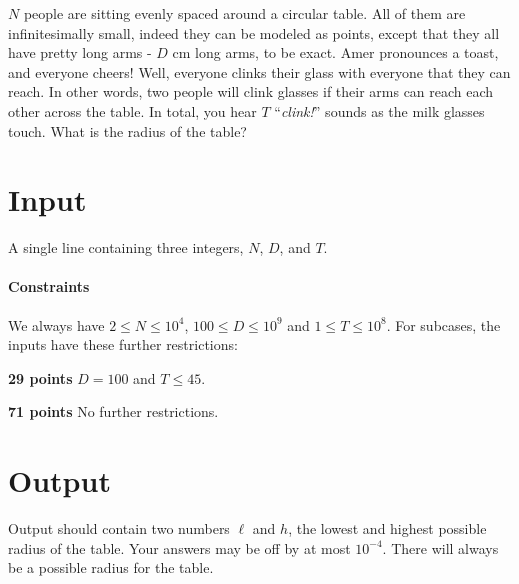 $N$ people are sitting evenly spaced around a circular table. All of them are infinitesimally small, indeed they can be modeled as points, except that they all have pretty long arms - $D$ cm long arms, to be exact. Amer pronounces a toast, and everyone cheers! Well, everyone clinks their glass with everyone that they can reach. In other words, two people will clink glasses if their arms can reach each other across the table. In total, you hear $T$ ``{\em clink!}'' sounds as the milk glasses touch. What is the radius of the table? 

\section*{Input}
A single line containing three integers, $N$, $D$, and $T$.

\paragraph*{Constraints} We always have $2 \leq N \leq 10^4$, $100 \leq D \leq 10^9$ and $1 \leq T \leq 10^{8}$. For subcases, the inputs have these further restrictions:

\begin{description}
  \item{\textbf{29 points}} $D = 100$ and $T \leq 45$.
  \item{\textbf{71 points}} No further restrictions.
\end{description}

\section*{Output}
Output should contain two numbers $\ell$ and $h$, the lowest and highest possible radius of the table. Your answers may be off by at most $10^{-4}$. There will always be a possible radius for the table.




